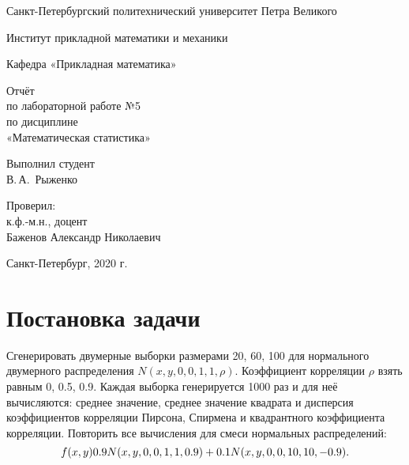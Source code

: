 \documentclass[12pt,a4paper]{scrartcl}
\begin{document}
\begin{titlepage}
  \begin{center}

    Санкт-Петербургский политехнический университет Петра Великого

    \vspace{0.25cm}
    
    Институт прикладной математики и механики
    
    Кафедра «Прикладная математика»
    \vfill

	\vspace{0.25cm}
	    Отчёт\\
	по лабораторной работе №5\\
	по дисциплине\\
	«Математическая статистика»

  \bigskip

\end{center}
\vfill

\newlength{\ML}
\hfill\begin{minipage}{0.4\textwidth}
  Выполнил студент\\ В.\,А.~Рыженко\\
\end{minipage}%
\bigskip

\hfill\begin{minipage}{0.4\textwidth}
  Проверил:\\
к.ф.-м.н., доцент\\
Баженов Александр Николаевич\\
\end{minipage}%
\vfill

\begin{center}
  Санкт-Петербург, 2020 г.
\end{center}
\end{titlepage}

\tableofcontents
\listoffigures
\listoftables
\newpage

\section{Постановка задачи}
 
Сгенерировать двумерные выборки размерами 20, 60, 100 для нормального двумерного распределения $N(x,y,0,0,1,1, \rho)$.
Коэффициент корреляции $\rho$ взять равным 0, 0.5, 0.9.
Каждая выборка генерируется 1000 раз и для неё вычисляются: среднее значение, среднее значение квадрата и дисперсия коэффициентов
корреляции Пирсона, Спирмена и квадрантного коэффициента корреляции.
Повторить все вычисления для смеси нормальных распределений:
\begin{equation}\label{eq:smes}
\centering
f(x, y) 0.9N(x, y, 0, 0, 1, 1, 0.9) + 0.1N(x, y, 0, 0, 10, 10, -0.9).
\end{equation}
\end{document}
